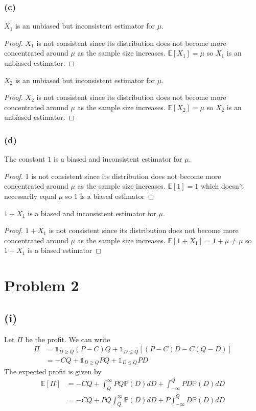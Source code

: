 \documentclass[twoside,11pt]{homework}
\begin{document}
\subsubsection*{(c)}
	\begin{claim}
		$X_1$ is an unbiased but inconsistent estimator for $\mu$.
	\end{claim}
	\begin{proof}
		$X_1$ is not consistent since its distribution does not become more concentrated around $\mu$ 
		as the sample size increases.
		$\mathbb{E}[X_1] =\mu$ so $X_1$ is an unbiased estimator.
	\end{proof}
	\begin{claim}
		$X_2$ is an unbiased but inconsistent estimator for $\mu$.
	\end{claim}
	\begin{proof}
		$X_2$ is not consistent since its distribution does not become more concentrated around $\mu$ 
		as the sample size increases.
		$\mathbb{E}[X_2] =\mu$ so $X_2$ is an unbiased estimator.
	\end{proof}
\subsubsection*{(d)}
	\begin{claim}
		The constant $1$ is a biased and inconsistent estimator for $\mu$.
	\end{claim}
	\begin{proof}
		1 is not consistent since its distribution does not become more concentrated around $\mu$ 
		as the sample size increases.
		$\mathbb{E}[1] = 1 $ which doesn't necessarily equal $\mu$ so 1 is a biased estimator
	\end{proof}
	\begin{claim}
		$1+X_1$ is a biased and inconsistent estimator for $\mu$.
	\end{claim}
	\begin{proof}
		$1 + X_1$ is not consistent since its distribution does not become more concentrated around $\mu$ 
		as the sample size increases.
		$\mathbb{E}[1+X_1] = 1 + \mu \neq \mu $  so $1 + X_1$ is a biased estimator
	\end{proof}
	
\section*{Problem 2} 
\subsection*{(i)}
	Let $\Pi$ be the profit. We can write
	\begin{align*}
		\Pi &= \mathds{1}_{D\geq Q} (P-C)Q + \mathds{1}_{D\leq Q} \left[(P-C)D-C(Q-D)\right] \\
		&= -CQ +\mathds{1}_{D\geq Q} PQ+\mathds{1}_{D\leq Q} PD
	\end{align*}
	The expected profit is given by
	\begin{align*}
		\mathbb{E} [\Pi] &= -CQ+\int_Q^\infty PQ\mathbb{P}(D)dD
		+ \int_{-\infty}^Q PD\mathbb{P}(D)dD \\
		&= -CQ+ PQ\int_Q^\infty \mathbb{P}(D)dD
		+ P\int_{-\infty}^Q D\mathbb{P}(D)dD
	\end{align*}
\end{document}
